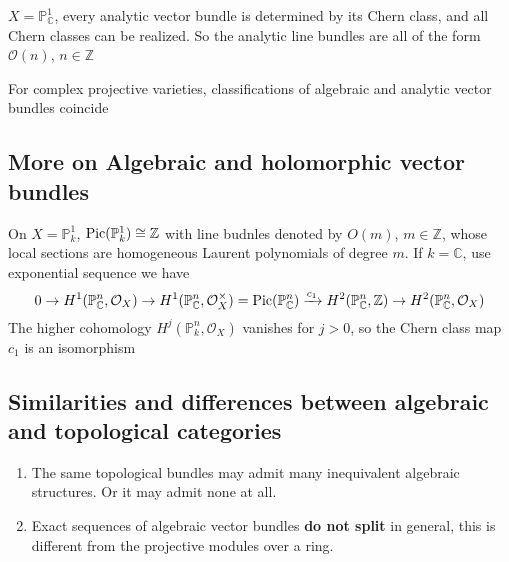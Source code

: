 \documentclass[main]{subfiles}
\begin{document}
\begin{example}
$X=\mathbb{P}^1_{\mathbb C}$, every analytic vector bundle is determined by its Chern class, and all Chern classes can be realized. So the analytic line bundles are all of the form $\mathcal O(n)$, $n\in\mathbb Z$
\end{example}

\begin{theorem}
For complex projective varieties, classifications of algebraic and analytic vector bundles coincide
\end{theorem}

\subsection{More on Algebraic and holomorphic vector bundles}

\begin{example}
On $X=\mathbb P^1_k$, $\operatorname{Pic}(\mathbb P^1_k)\cong\mathbb Z$ with line budnles denoted by $O(m)$, $m\in\mathbb Z$, whose local sections are homogeneous Laurent polynomials of degree $m$. If $k=\mathbb C$, use exponential sequence we have
\[0\to H^1(\mathbb{P}^n_{\mathbb C},\mathcal O_X)\to H^1(\mathbb {P}^n_{\mathbb C},\mathcal O_X^\times)=\operatorname{Pic}(\mathbb P_{\mathbb C}^n)\xrightarrow{c_1} H^2(\mathbb P_{\mathbb C}^n,\mathbb Z)\to H^2(\mathbb P_{\mathbb C}^n,\mathcal O_X)\]
The higher cohomology $H^j(\mathbb P^n_k,\mathcal O_X)$ vanishes for $j>0$, so the Chern class map $c_1$ is an isomorphism
\end{example}

\subsection{Similarities and differences between algebraic and topological categories}

\begin{enumerate}
\item The same topological bundles may admit many inequivalent algebraic structures. Or it may admit none at all.
\item Exact sequences of algebraic vector bundles \textbf{do not split} in general, this is different from the projective modules over a ring.
\end{enumerate}
\end{document}
